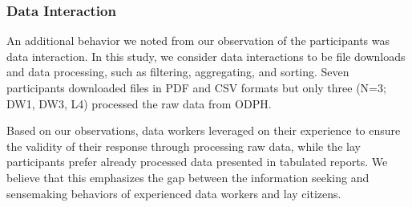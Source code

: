 \documentclass{sigchi}
\begin{document}
\subsubsection{Data Interaction}
An additional behavior we noted from our observation of the participants was data interaction. In this study, we consider data interactions to be file downloads and data processing, such as filtering, aggregating, and sorting. Seven participants downloaded files in PDF and CSV formats but only three (N=3; DW1, DW3, L4) processed the raw data from ODPH.

Based on our observations, data workers leveraged on their experience to ensure the validity of their response through processing raw data, while the lay participants prefer already processed data presented in tabulated reports. We believe that this emphasizes the gap between the information seeking and sensemaking behaviors of experienced data workers and lay citizens.


\end{document}
